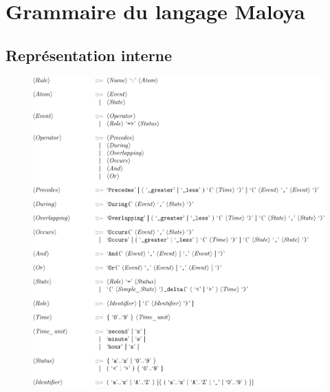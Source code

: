 \chapter{Grammaire du langage Maloya}
\section*{Représentation interne }
\begin{figure}
  \centering
  \includegraphics[scale=.8]{gfx/bnfintern.pdf}
  \label{fig:bnf2}
\end{figure}
\newpage
